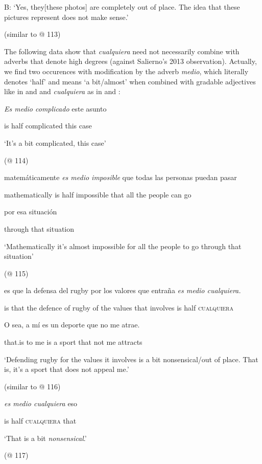 B: ‘Yes, they[these photos] are completely out of place. The idea that these pictures represent does not make sense.’

  (similar to @ 113)

The following data show that \textit{cualquiera} need not necessarily combine with adverbs that denote high degrees (against Salierno’s 2013 observation). Actually, we find two occurences with modification by the adverb \textit{medio}, which literally denotes ‘half’ and means ‘a bit/almost’ when combined with gradable adjectives like in  and  and \textit{cualquiera} as in  and :

\label{bkm:Ref150786427}    \textit{Es  medio  complicado} este  asunto

    is  half  complicated  this  case

    ‘It’s a bit complicated, this case’

    (@ 114)

\label{bkm:Ref150786436}    matemáticamente  \textit{es  medio  imposible} que  todas  las  personas  puedan  pasar

    mathematically  is  half  impossible  that  all  the  people  can  go

    por  esa  situación

    through  that  situation

    ‘Mathematically it’s almost impossible for all the people to go through that situation’

    (@ 115)

\label{bkm:Ref150786444}    es  que  la  defensa  del  rugby  por  los  valores  que  entraña  \textit{es  medio  cualquiera.}

    is  that  the  defence  of  rugby  of  the  values  that  involves  is  half  \textsc{cualquiera}

    O sea,  a  mí  es  un  deporte  que  no  me  atrae.      

    that.is  to  me  is  a  sport  that  not  me  attracts      

    ‘Defending rugby for the values it involves is a bit nonsensical/out of place. That is, it’s a sport that does not appeal me.’

    (similar to @ 116)

\label{bkm:Ref150786457}    \textit{es  medio  cualquiera} eso

    is  half  \textsc{cualquiera}  that

    ‘That is a bit \textit{nonsensical}.’

    (@ 117)

